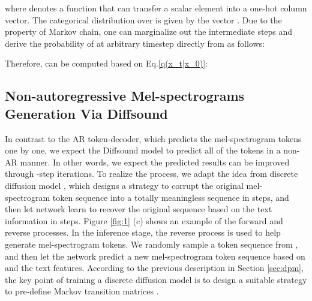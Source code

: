 \documentclass[lettersize,journal]{IEEEtran}
\begin{document}
where  denotes a function that can transfer a scalar element into a one-hot column vector. 
The categorical distribution over  is given by the vector . 
{\color{black} Due to the property of Markov chain}, one can marginalize out the intermediate steps and derive the probability of  at arbitrary timestep directly from  as follows:

Therefore,  can be computed based on Eq.\ref{q(x_t|x_0)}:

\subsection{Non-autoregressive Mel-spectrograms Generation Via Diffsound}
In contrast to the AR token-decoder, which predicts the mel-spectrogram tokens one by one, we expect the Diffsound model to predict all of the tokens in a non-AR manner. {\color{black}{Specifically, the Diffsound model can predict all of the tokens simultaneously, then refine the predicted results in the following steps so that the best results can be obtained through iterations.}} In other words, we expect the predicted results can be improved through -step iterations. {\color{black}{In contrast, AR decoder needs  steps to get results, where  denotes the number of tokens (in practice, ).}} {\color{black}{The Diffsound model can make use of the contextual information of all tokens and revise any token in each step. We speculate that it effectively diminishes the unnatural bias and the accumulated prediction error problems.}} To realize the process, we adapt the idea from discrete diffusion model \cite{sohl2015deep,austin2021structured,gu2021vector}, which designs a strategy to corrupt the original mel-spectrogram token sequence  into a totally meaningless sequence  in  steps, and then let network learn to recover the original sequence  based on the text information in  steps. Figure \ref{fig:1} (c) shows an example of the forward and reverse processes. In the inference stage, the reverse process is used to help generate mel-spectrogram tokens. We randomly sample a token sequence  from , and then let the network predict a new mel-spectrogram token sequence based on  and the text features. According to the previous description in Section \ref{sec:dpm}, the key point of training a discrete diffusion model is to design a suitable strategy to pre-define Markov transition matrices .
\end{document}
